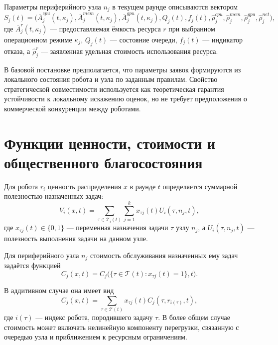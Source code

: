 Параметры периферийного узла $n_j$ в текущем раунде описываются вектором
\begin{equation}
S_j(t)=
\bigl(\bar{A}^{cpu}_{j}(t,\kappa_j),\bar{A}^{mem}_{j}(t,\kappa_j),\bar{A}^{gpu}_{j}(t,\kappa_j), Q_j(t), f_j(t), \widehat{\rho}^{cpu}_{j},\widehat{\rho}^{mem}_{j},\widehat{\rho}^{gpu}_{j},\widehat{\rho}^{net}_{j}\bigr),
\label{eq:ch3_node_state}
\end{equation}
где $\bar{A}^{r}_{j}(t,\kappa_j)$ --- предоставляемая ёмкость ресурса $r$ при выбранном операционном режиме $\kappa_j$, $Q_j(t)$ --- состояние очереди, $f_j(t)$ --- индикатор отказа, а $\widehat{\rho}^{r}_{j}$ --- заявленная удельная стоимость использования ресурса.

В базовой постановке предполагается, что параметры заявок формируются из локального состояния робота и узла по заданным правилам. Свойство стратегической совместимости используется как теоретическая гарантия устойчивости к локальному искажению оценок, но не требует предположения о коммерческой конкуренции между роботами.

\section{Функции ценности, стоимости и общественного благосостояния}

Для робота $r_i$ ценность распределения $x$ в раунде $t$ определяется суммарной полезностью назначенных задач:
\begin{equation}
V_i(x,t)=
\sum_{\tau \in \mathcal{T}_i(t)}\sum_{j=1}^{k}x_{\tau j}(t)U_i(\tau,n_j,t),
\label{eq:ch3_robot_value}
\end{equation}
где $x_{\tau j}(t)\in\{0,1\}$ --- переменная назначения задачи $\tau$ узлу $n_j$, а $U_i(\tau,n_j,t)$ --- полезность выполнения задачи на данном узле.

Для периферийного узла $n_j$ стоимость обслуживания назначенных ему задач задаётся функцией
\begin{equation}
C_j(x,t)=C_j\bigl(\{\tau \in \mathcal{T}(t):x_{\tau j}(t)=1\},t\bigr).
\label{eq:ch3_node_cost}
\end{equation}

В аддитивном случае она имеет вид
\begin{equation}
C_j(x,t)=
\sum_{\tau \in \mathcal{T}(t)}x_{\tau j}(t)C_j(\tau,r_{i(\tau)},t),
\label{eq:ch3_additive_cost}
\end{equation}
где $i(\tau)$ --- индекс робота, породившего задачу $\tau$. В более общем случае стоимость может включать нелинейную компоненту перегрузки, связанную с очередью узла и приближением к ресурсным ограничениям.

